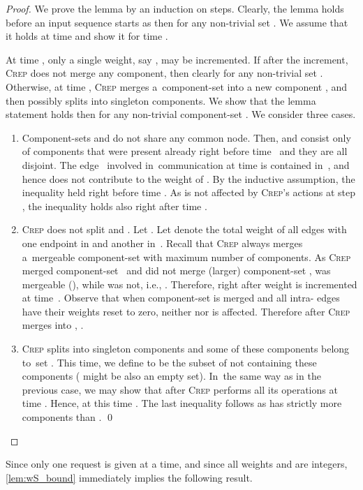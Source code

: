 \documentclass{siamart190516}
\newcommand{\CREP}{\textsc{Crep}\xspace}
\begin{document}
\begin{proof}
We prove the lemma by an induction on steps. Clearly, the lemma holds before an
input sequence starts as then  for any non-trivial set . We assume that it holds at time 
and show it for time .

At time , only a single weight, say , may be incremented. If after
the increment, \CREP does not merge any component, then clearly  for any non-trivial set . Otherwise, at time , \CREP
merges a~component-set  into a new component , and then possibly
splits  into singleton components. We show that
the lemma statement holds then for any non-trivial component-set . We
consider three cases.

\begin{enumerate}

\item Component-sets  and  do not share any common node. Then,  and
 consist only of components that were present already right before time~
and they are all disjoint. The edge~ involved in~communication at time
 is contained in~, and hence does not contribute to the weight of
. By the inductive assumption, the inequality 
 held right
before time . As  is not affected by \CREP's actions at step , the
inequality holds also right after time .

\item \CREP does not split  and . Let . Let  denote the total weight of all edges with one endpoint
in  and another in~. Recall that
\CREP always merges a~mergeable component-set with maximum number of components. 
As \CREP merged component-set~ and did not merge
(larger) component-set ,  was mergeable (), while  was not, i.e., . Therefore,  right after weight  is incremented at time~. Observe
that when component-set  is merged and all intra- edges have their weights 
reset to zero, neither  nor  is affected.
Therefore after \CREP merges  into , .

\item \CREP splits  into singleton components  
and some of these components belong to~set . This time, we define  to be
the subset of  not containing these components ( might be also an empty set). In~the
same way as in the previous case, we may show that  after \CREP performs all its operations at time . Hence, at this
time .
The last inequality follows as  has strictly more components than .
\qed
\end{enumerate}
\end{proof}

Since only one request is given at a time, and since all weights and 
are integers, \cref{lem:wS_bound} immediately implies the following
result.
\end{document}
